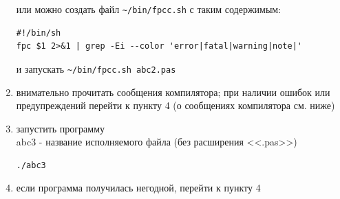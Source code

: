 \documentclass[unicode, 12pt, a4paper,oneside,fleqn]{article}
\begin{document}
\begin{enumerate}


{\scriptsize

или можно создать файл \verb!~/bin/fpcc.sh! с таким содержимым:
\begin{verbatim}
#!/bin/sh
fpc $1 2>&1 | grep -Ei --color 'error|fatal|warning|note|'
\end{verbatim}
и запускать \verb!~/bin/fpcc.sh abc2.pas!
}

\item внимательно прочитать сообщения компилятора; при наличии ошибок
  или предупреждений перейти к пункту 4 (о сообщениях компилятора см. ниже)
  
\item запустить программу\\
  abc3 - название исполняемого файла (без расширения <<.pas>>)
\begin{verbatim}
./abc3
\end{verbatim}
  
\item если программа получилась негодной, перейти к пункту 4


\end{enumerate}
\end{document}
